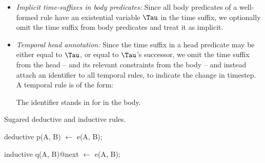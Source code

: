 \begin{itemize}
%
%
\item {\em Implicit time-suffixes in body predicates:} Since all body
predicates of a well-formed rule have an existential variable $\Tau$ in the
time suffix, we optionally omit the time suffix from body predicates and treat
it as implicit.
%
\item {\em Temporal head annotation:} Since the time suffix in a head predicate
may be either equal to $\Tau$, or equal to $\Tau$'s successor, we omit the time
suffix from the head -- and its relevant constraints from the body -- and
instead attach an identifier to all temporal rules, to indicate the change in
timestep.  A temporal rule is of the form:


The identifier  stands in for  in
the body.

%
%
%
%
%
\end{itemize}


\begin{example}
Sugared deductive and inductive rules.

\begin{Dedalus}
deductive
p(A, B) \(\leftarrow\) e(A, B);
  
inductive 
q(A, B)@next \(\leftarrow\) e(A, B);
\end{Dedalus}
\end{example}


